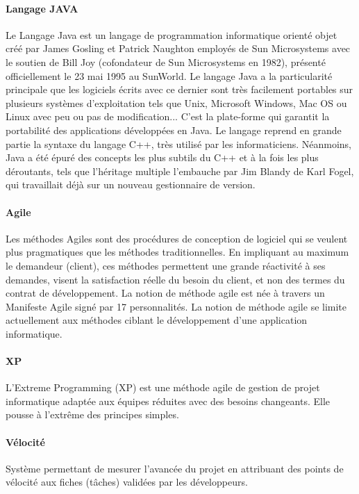 \documentclass[12pt,oneside]{book}
\begin{document}
\paragraph{Langage JAVA}
Le Langage Java est un langage de programmation informatique orienté objet créé par James Gosling et Patrick Naughton employés de Sun Microsystems avec le soutien de Bill Joy (cofondateur de Sun Microsystems en 1982), présenté officiellement le 23 mai 1995 au SunWorld. Le langage Java a la particularité principale que les logiciels écrits avec ce dernier sont très facilement portables sur plusieurs systèmes d'exploitation tels que Unix, Microsoft Windows, Mac OS ou Linux avec peu ou pas de modification... C'est la plate-forme qui garantit la portabilité des applications développées en Java. Le langage reprend en grande partie la syntaxe du langage C++, très utilisé par les informaticiens. Néanmoins, Java a été épuré des concepts les plus subtils du C++ et à la fois les plus déroutants, tels que l'héritage multiple 	 l'embauche par Jim Blandy de Karl Fogel, qui travaillait déjà sur un nouveau gestionnaire de version. 

\paragraph{Agile}
Les méthodes Agiles sont des procédures de conception de logiciel qui se veulent plus pragmatiques que les méthodes traditionnelles. En impliquant au maximum le demandeur (client), ces méthodes permettent une grande réactivité à ses demandes, visent la satisfaction réelle du besoin du client, et non des termes du contrat de développement. La notion de méthode agile est née à travers un Manifeste Agile signé par 17 personnalités. La notion de méthode agile se limite actuellement aux méthodes ciblant le développement d'une application informatique.

\paragraph{XP}
L'Extreme Programming (XP) est une méthode agile de gestion de projet informatique adaptée aux équipes réduites avec des besoins changeants. Elle pousse à l'extrême des principes simples. 

\paragraph{Vélocité}
Système permettant de mesurer l'avancée du projet en attribuant des points de vélocité aux fiches (t\^aches) validées par les développeurs.
\end{document}
